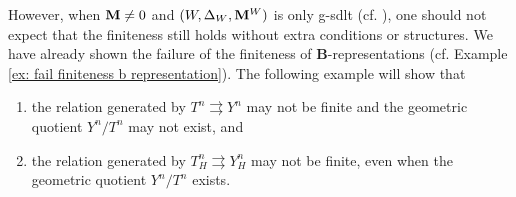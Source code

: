 \documentclass[11pt]{amsart}
\numberwithin{equation}{section}
\newcommand{\Mm}{{\bf{M}}}
\theoremstyle{definition}
\theoremstyle{definition}
\theoremstyle{definition}
\begin{document}
However, when $\Mm\neq0$ and $(W,\Delta_W,\Mm^W)$ is only g-sdlt (cf. \cite{Hu21}), one should not expect that the finiteness still holds without extra conditions or structures. We have already shown the failure of the finiteness of \textbf{B}-representations (cf. Example \ref{ex: fail finiteness b representation}). The following example will show that
\begin{enumerate}
    \item the relation generated by $T^n\rightrightarrows Y^n$ may not be finite and the geometric quotient $Y^n/T^n$ may not exist, and
    \item the relation generated by $T^n_H\rightrightarrows Y^n_H$ may not be finite, even when the geometric quotient $Y^n/T^n$ exists. 
\end{enumerate}
\end{document}
